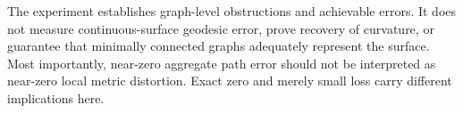 \documentclass[10pt]{article}
\begin{document}
The experiment establishes graph-level obstructions and achievable errors. It
does not measure continuous-surface geodesic error, prove recovery of curvature,
or guarantee that minimally connected graphs adequately represent the surface.
Most importantly, near-zero aggregate path error should not be interpreted as
near-zero local metric distortion. Exact zero and merely small loss carry
different implications here.





\end{document}
